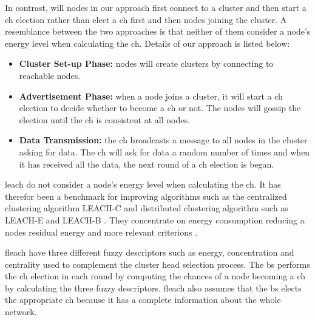 \documentclass[USenglish]{uit-thesis}
\begin{document}
In contrast, will nodes in our approach first connect to a cluster and then start a \gls{ch} election rather than elect a \gls{ch} first and then nodes joining the cluster. %
A resemblance between the two approaches is that neither of them consider a node's energy level when calculating the \gls{ch}. Details of our approach is listed below:

\begin{itemize}
\item \textbf{Cluster Set-up Phase:} nodes will create clusters by connecting to reachable nodes.
\item \textbf{Advertisement Phase:} when a node joins a cluster, it will start a \gls{ch} election to decide whether to become a \gls{ch} or not. The nodes will gossip the election until the \gls{ch} is consistent at all nodes.
\item \textbf{Data Transmission:} the \gls{ch} broadcasts a message to all nodes in the cluster asking for data. The \gls{ch} will ask for data a random number of times and when it has received all the data, the next round of a \gls{ch} election is began.
\end{itemize}




\gls{leach} do not consider a node's energy level when calculating the \gls{ch}. It has therefor been a benchmark for improving algorithms such as the centralized clustering algorithm LEACH-C \cite {leach_c} and distributed clustering algorithm such as LEACH-E \cite{leach_e} and LEACH-B \cite{leach_b}. They concentrate on energy consumption reducing a nodes residual energy and more relevant criterions \cite{dec_cb_alg}.



\Gls{fleach} \cite{fuzzy_logic, ch_fuzzy} have three different fuzzy descriptors such as energy, concentration and centrality used to complement the cluster head selection process. The \gls{bs} performs the \gls{ch} election in each round by computing the chances of a node becoming a \gls{ch} by calculating the three fuzzy descriptors. \Gls{fleach} also assumes that the \gls{bs} elects the appropriate \gls{ch} because it has a complete information about the whole network.
\end{document}
